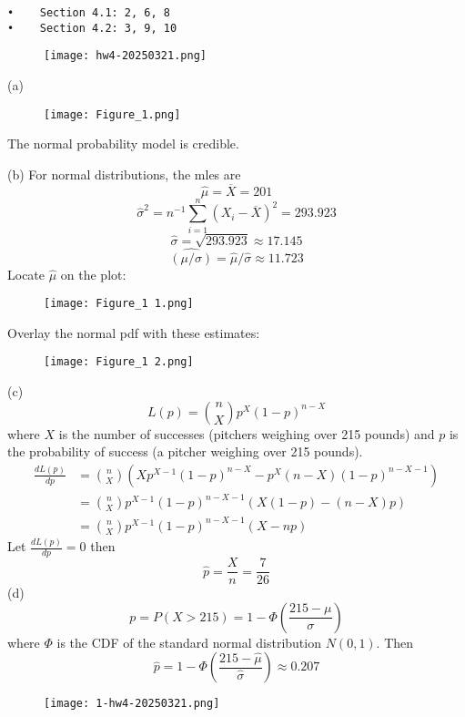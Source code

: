 \begin{lstlisting}
•    Section 4.1: 2, 6, 8  
•    Section 4.2: 3, 9, 10
\end{lstlisting}
\begin{figure}[H]
\centering
\texttt{[image: hw4-20250321.png]}
\label{}
\end{figure}

(a)
\begin{figure}[H]
\centering
\texttt{[image: Figure\_1.png]}
\label{}
\end{figure}
The normal probability model is credible.

(b)
For normal distributions, the mles are
\[
\widehat{\mu}=\overline{X}=201
\]
\[
\widehat{\sigma }^{2}=n^{-1}\sum_{i=1}^{n} (X_i-\overline{X})^{2}=293.923
\]
\[
\widehat{\sigma}=\sqrt{ 293.923 }\approx17.145
\]
\[
\widehat{(\mu/\sigma)}=\widehat{\mu}/\widehat{\sigma}\approx11.723
\]
Locate $\widehat{\mu}$ on the plot:
\begin{figure}[H]
\centering
\texttt{[image: Figure\_1 1.png]}
\label{}
\end{figure}

Overlay the normal pdf with these estimates:
\begin{figure}[H]
\centering
\texttt{[image: Figure\_1 2.png]}
\label{}
\end{figure}

(c)
\[
L(p)={\binom{n}{X} }p^{X}(1-p)^{n-X}
\]
where $X$ is the number of successes (pitchers weighing over 215 pounds) and $p$ is the probability of success (a pitcher weighing over 215 pounds).
\[
\begin{aligned}
\frac{dL(p)}{dp} & ={\binom{n}{X} }(Xp^{X-1}(1-p)^{n-X}-p^{X}(n-X)(1-p)^{n-X-1}) \\
 & ={\binom{n}{X} }p^{X-1}(1-p)^{n-X-1}(X(1-p)-(n-X)p) \\
 & ={\binom{n}{X} }p^{X-1}(1-p)^{n-X-1}(X-np)
\end{aligned}
\]
Let $\frac{dL(p)}{dp}=0$ then
\[
\widehat{p}=\frac{X}{n}=\frac{7}{26}
\]
(d)
\[
p=P(X>215)=1-\Phi\left( \frac{215-\mu}{\sigma} \right)
\]
where $\Phi$ is the CDF of the standard normal distribution $N(0,1)$. Then
\[
\widehat{p}=1-\Phi\left( \frac{215-\widehat{\mu}}{\widehat{\sigma}} \right)\approx0.207
\]
\begin{figure}[H]
\centering
\texttt{[image: 1-hw4-20250321.png]}
\label{}
\end{figure}

